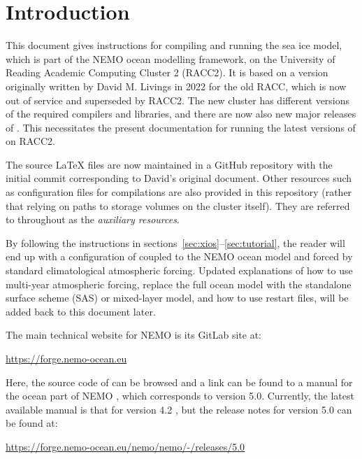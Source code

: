 \section{Introduction}
\label{sec:intro}

This document gives instructions for compiling and running the \SIcu{} sea ice model, which is part of the NEMO ocean modelling framework, on the University of Reading Academic Computing Cluster 2 (RACC2).
It is based on a version originally written by David M. Livings in 2022 for the old RACC, which is now out of service and superseded by RACC2.
The new cluster has different versions of the required compilers and libraries, and there are now also new major releases of \NEMOSIcu{}.
This necessitates the present documentation for running the latest versions of \NEMOSIcu{} on RACC2.

The source \LaTeX{} files are now maintained in a GitHub repository with the initial commit corresponding to David's original document.
Other resources such as configuration files for compilations are also provided in this repository (rather that relying on paths to storage volumes on the cluster itself).
They are referred to throughout as the \textit{auxiliary resources}.

By following the instructions in sections~\ref{sec:xios}--\ref{sec:tutorial}, the reader will end up with a configuration of \SIcu{} coupled to the NEMO ocean model and forced by standard climatological atmospheric forcing.
Updated explanations of how to use multi-year atmospheric forcing, replace the full ocean model with the standalone surface scheme (SAS) or mixed-layer model, and how to use restart files, will be added back to this document later.

The main technical website for NEMO is its GitLab site at:

\begin{center}
    \url{https://forge.nemo-ocean.eu}
\end{center}

Here, the source code of \NEMOSIcu{} can be browsed and a link can be found to a manual for the ocean part of NEMO \citep{nemo-5.0.0}, which corresponds to version 5.0.
Currently, the latest available \SIcu{} manual is that for version 4.2 \citep{si3-4.2.0}, but the release notes for version 5.0 can be found at:

\begin{center}
    \url{https://forge.nemo-ocean.eu/nemo/nemo/-/releases/5.0}
\end{center}
